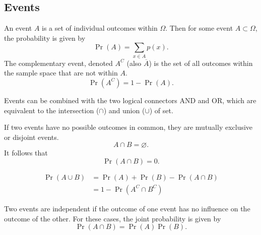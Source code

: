 \documentclass{article}
\begin{document}
\subsection{Events}
\begin{definition}[Events]
    An event \(A\) is a set of individual outcomes within \(\Omega \).
    Then for some event \(A\subset\Omega \), the probability is given by
    \begin{equation*}
        \Pr{\left( A \right)} = \sum_{x\in A} p(x).
    \end{equation*}
    The complementary event, denoted \(A^C\) (also \(\overline{A}\)) is the set of all
    outcomes within the sample space that are not within \(A\).
    \begin{equation*}
        \Pr{\left( A^C \right)} = 1 - \Pr{\left( A \right)}.
    \end{equation*}
\end{definition}
\begin{definition}
    Events can be combined with the two logical connectors AND and OR, which are
    equivalent to the intersection (\(\cap\)) and union (\(\cup\)) of set.
\end{definition}
\begin{definition}
    If two events have no possible outcomes in common, they are mutually exclusive or disjoint events.
    \begin{equation*}
        A \cap B = \varnothing.
    \end{equation*}
    It follows that
    \begin{equation*}
        \Pr{\left( A \cap B \right)} = 0.
    \end{equation*}
\end{definition}
\begin{theorem}
    \begin{align*}
        \Pr{\left( A \cup B \right)} & = \Pr{\left( A \right)} + \Pr{\left( B \right)} - \Pr{\left( A \cap B \right)} \\
                                     & = 1 - \Pr{\left( A^C \cap B^C \right)}
    \end{align*}
\end{theorem}
\begin{definition}
    Two events are independent if the outcome of one event has no influence on the outcome of the other.
    For these cases, the joint probability is given by
    \begin{equation*}
        \Pr{\left( A \cap B \right)} = \Pr{\left( A \right)} \Pr{\left( B \right)}.
    \end{equation*}
\end{definition}
\end{document}
